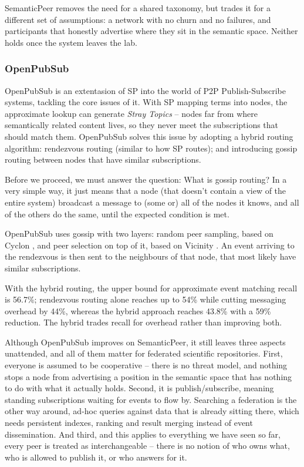 SemanticPeer removes the need for a shared taxonomy, but trades it for a different set of assumptions: a network with no churn and no failures, and participants that honestly advertise where they sit in the semantic space. Neither holds once the system leaves the lab.

\subsubsection{OpenPubSub}
\label{sec:OpenPubSub}
OpenPubSub is an extentasion of SP into the world of P2P Publish-Subscribe systems, tackling the core issues of it. With SP mapping terms into nodes, the approximate lookup can generate \textit{Stray Topics} – nodes far from where semantically related content lives, so they never meet the subscriptions that should match them. OpenPubSub solves this issue by adopting a hybrid routing algorithm: rendezvous routing (similar to how SP routes); and introducing gossip routing between nodes that have similar subscriptions.

Before we proceed, we must answer the question: What is gossip routing? In a very simple way, it just means that a node (that doesn't contain a view of the entire system) broadcast a message to (some or) all of the nodes it knows, and all of the others do the same, until the expected condition is met. 

OpenPubSub uses gossip with two layers: random peer sampling, based on Cyclon \cite{voulgaris2005cyclon}, and peer selection on top of it, based on Vicinity \cite{voulgaris2013vicinity}. An event arriving to the rendezvous is then sent to the neighbours of that node, that most likely have similar subscriptions.

With the hybrid routing, the upper bound for approximate event matching recall is 56.7\%; rendezvous routing alone reaches up to 54\% while cutting messaging overhead by 44\%, whereas the hybrid approach reaches 43.8\% with a 59\% reduction. The hybrid trades recall for overhead rather than improving both.

Although OpenPubSub improves on SemanticPeer, it still leaves three aspects unattended, and all of them matter for federated scientific repositories. First, everyone is assumed to be cooperative – there is no threat model, and nothing stops a node from advertising a position in the semantic space that has nothing to do with what it actually holds. Second, it is publish/subscribe, meaning standing subscriptions waiting for events to flow by. Searching a federation is the other way around, ad-hoc queries against data that is already sitting there, which needs persistent indexes, ranking and result merging instead of event dissemination. And third, and this applies to everything we have seen so far, every peer is treated as interchangeable – there is no notion of who owns what, who is allowed to publish it, or who answers for it.

